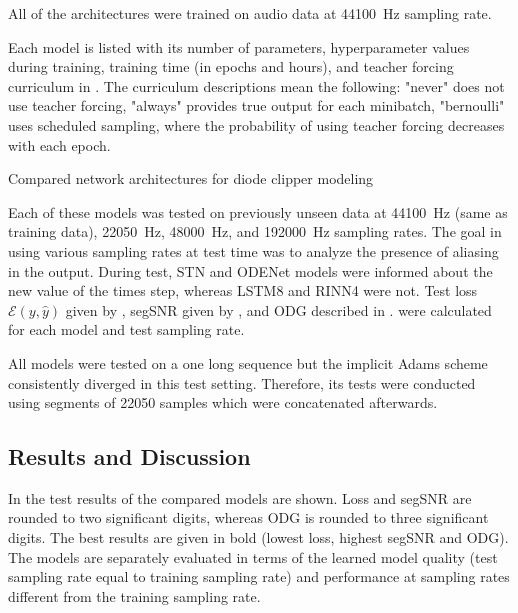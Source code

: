 All of the architectures were trained on audio data at \SI{44100}{Hz} sampling rate.

Each model is listed with its number of parameters,
hyperparameter values during training, training time (in epochs and hours), and teacher forcing curriculum in . The curriculum descriptions mean the following: "never" does not use teacher forcing, "always" provides true output for each minibatch, "bernoulli" uses scheduled sampling, where the probability of using teacher forcing decreases with each epoch. 
\begin{table}[]
    \caption{Compared network architectures for diode clipper modeling}
    
    \label{tab:diode_clipper_models_data}
\end{table}

Each of these models was tested on previously unseen data at \SI{44100}{Hz} (same as training data), \SI{22050}{Hz}, \SI{48000}{Hz}, and \SI{192000}{Hz} sampling rates. The goal in using various sampling rates at test time was to analyze the presence of aliasing in the output. During test, \ac{STN} and ODENet models were informed about the new value of the times step, whereas \ac{LSTM}8 and \ac{RINN}4 were not. Test loss $\mathcal{E}(y, \hat{y})$ given by , \ac{segSNR} given by , and \ac{ODG} described in .
were calculated for each model and test sampling rate.

All models were tested on a one long sequence but the implicit Adams scheme consistently diverged in this test setting. Therefore, its tests were conducted using segments of 22050 samples which were concatenated afterwards.

\subsection{Results and Discussion}
\label{sec:diode_clipper_results}

In  the test results of the compared models are shown. Loss and \ac{segSNR} are rounded to two significant digits, whereas \ac{ODG} is rounded to three significant digits. The best results are given in bold (lowest loss, highest \ac{segSNR} and \ac{ODG}). The models are separately evaluated in terms of the learned model quality (test sampling rate equal to training sampling rate) and performance at sampling rates different from the training sampling rate. 


